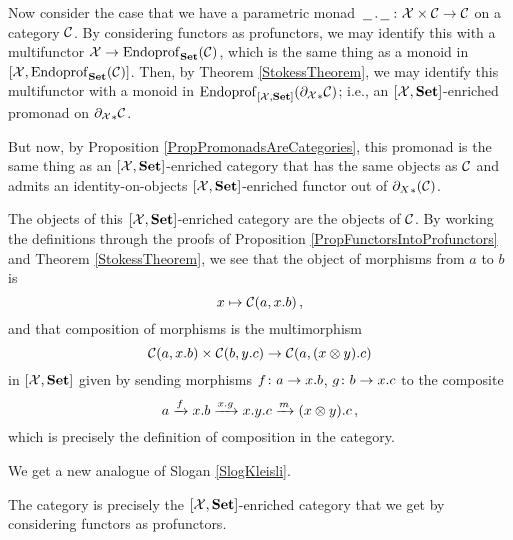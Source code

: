 Now consider the case that we have a parametric monad $\,\underline{\hspace{1.5ex}}\,.\,\underline{\hspace{1.5ex}}\,\colon\mathcal X \times {\mathcal{C}} \to {\mathcal{C}}$ on a category ${\mathcal{C}}$.  
By considering functors as profunctors, we may identify this with a multifunctor $\mathcal X \to \operatorname{Endoprof}_{\normalfont\textbf{Set}}({\mathcal{C}})$, which is the same thing as a monoid in $[\mathcal X,\operatorname{Endoprof}_{\normalfont\textbf{Set}}({\mathcal{C}})]$.
Then, by Theorem \ref{StokessTheorem}, we may identify this multifunctor with a monoid in $\operatorname{Endoprof}_{[\mathcal X,{\normalfont\textbf{Set}}]}({\partial_\mathcal X}_*{\mathcal{C}})$; i.e., an $[\mathcal X,{\normalfont\textbf{Set}}]$-enriched promonad on ${\partial_\mathcal X}_*{\mathcal{C}}$.

But now, by Proposition \ref{PropPromonadsAreCategories}, this promonad is the same thing as an $[\mathcal X,{\normalfont\textbf{Set}}]$-enriched category that has the same objects as ${\mathcal{C}}$ and admits an identity-on-objects $[\mathcal X,{\normalfont\textbf{Set}}]$-enriched functor out of ${\partial_X}_*({\mathcal{C}})$.  

The objects of this $[\mathcal X,{\normalfont\textbf{Set}}]$-enriched category are the objects of ${\mathcal{C}}$.
By working the definitions through the proofs of Proposition \ref{PropFunctorsIntoProfunctors} and Theorem \ref{StokessTheorem}, we see that the object of morphisms from $a$ to $b$ is
\[
  x \mapsto {\mathcal{C}}(a,x.b)\,,
  \]
and that composition of morphisms is the multimorphism
\[
  {\mathcal{C}}(a,x.b) \times {\mathcal{C}}(b,y.c) \to {\mathcal{C}}(a,(x\otimes y).c)
  \]
in $[\mathcal X,{\normalfont\textbf{Set}}]$ given by sending morphisms $f\colon a \to x.b$, $g\colon b \to x.c$ to the composite
\[
  a
  \xrightarrow{f}
  x.b
  \xrightarrow{x.g}
  x.y.c \xrightarrow{m}
  (x\otimes y).c\,,
  \]
which is precisely the definition of composition in the \Mellies category.

We get a new analogue of Slogan \ref{SlogKleisli}.

\begin{slogan}
  The \Mellies category is precisely the $[\mathcal X,{\normalfont\textbf{Set}}]$-enriched category that we get by considering functors as profunctors.
\end{slogan}
